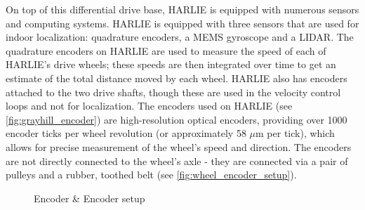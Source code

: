 On top of this differential drive base, HARLIE is equipped with numerous sensors and computing systems. HARLIE is equipped with three sensors that are used for indoor localization: quadrature encoders, a MEMS gyroscope and a LIDAR. The quadrature encoders on HARLIE are used to measure the speed of each of HARLIE's drive wheels; these speeds are then integrated over time to get an estimate of the total distance moved by each wheel. HARLIE also has encoders attached to the two drive shafts, though these are used in the velocity control loops and not for localization. The encoders used on HARLIE (see \autoref{fig:grayhill_encoder}) are high-resolution optical encoders, providing over 1000 encoder ticks per wheel revolution (or approximately 58 $\mu$m per tick), which allows for precise measurement of the wheel's speed and direction. The encoders are not directly connected to the wheel's axle - they are connected via a pair of pulleys  and a rubber, toothed belt (see \autoref{fig:wheel_encoder_setup}).

\begin{figure}
\centering
{}
\hfill
{}
\caption{Encoder \& Encoder setup}
\label{fig:encoder_and_setup}
\end{figure}

